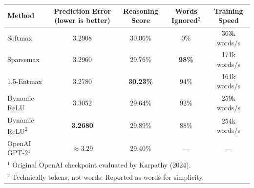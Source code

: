 \documentclass{standalone}
\begin{document}
\begin{tabular}{lcccc}
\toprule
Method & Prediction Error (lower is better) & Reasoning Score & Words Ignored$^2$ & Training Speed \\
\midrule
{\color{csoftmax}Softmax}          & 3.2908 & 30.06\%              & 0\%               & 363k words/s \\
{\color{csparsemax}Sparsemax}      & 3.2960 & 29.76\%              & \textbf{98\%}     & 171k words/s \\
{\color{centmax}1.5-Entmax}        & 3.2780 & \textbf{30.23\%}     & 94\%              & 161k words/s \\
{\color{cdrelu}Dynamic ReLU}       & 3.3052 & 29.64\%              & 92\%              & 259k words/s \\
{\color{cdrelu2}Dynamic ReLU\textsuperscript{2}} & \textbf{3.2680} & 29.89\% & 88\% & 254k words/s \\
OpenAI GPT-2$^1$                             & $\approx$3.29 & 29.40\%              & {---}             & {---} \\
\bottomrule
\multicolumn{5}{l}{\small $^1$ Original OpenAI checkpoint evaluated by Karpathy (2024).} \\
\multicolumn{5}{l}{\small $^2$ Technically tokens, not words. Reported as words for simplicity.} \\
\end{tabular}
\end{document}
